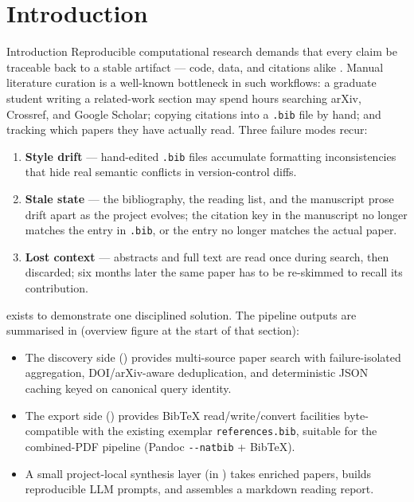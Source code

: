 \documentclass[
  ignorenonframetext,
]{beamer}
\author{\texorpdfstring{}{}}
\date{}
\providecommand{\tightlist}{%
  \setlength{\itemsep}{0pt}\setlength{\parskip}{0pt}}
\begin{document}
\section{Introduction}\label{sec:introduction}

\begin{frame}{Introduction}
Reproducible computational research demands that every claim be
traceable back to a stable artifact --- code, data, and citations alike
. Manual literature curation is a well-known
bottleneck in such workflows: a graduate student writing a related-work
section may spend hours searching arXiv, Crossref, and Google Scholar;
copying citations into a \texttt{.bib} file by hand; and tracking which
papers they have actually read. Three failure modes recur:

\begin{enumerate}
\tightlist
\item
  \textbf{Style drift} --- hand-edited \texttt{.bib} files accumulate
  formatting inconsistencies that hide real semantic conflicts in
  version-control diffs.
\item
  \textbf{Stale state} --- the bibliography, the reading list, and the
  manuscript prose drift apart as the project evolves; the citation key
  in the manuscript no longer matches the entry in \texttt{.bib}, or the
  entry no longer matches the actual paper.
\item
  \textbf{Lost context} --- abstracts and full text are read once during
  search, then discarded; six months later the same paper has to be
  re-skimmed to recall its contribution.
\end{enumerate}

 exists to demonstrate one disciplined
solution. The pipeline outputs are summarised in 
(overview figure at the start of that section):

\begin{itemize}
\tightlist
\item
  The discovery side
  (\href{../../../../infrastructure/search/}{})
  provides multi-source paper search with failure-isolated aggregation,
  DOI/arXiv-aware deduplication, and deterministic JSON caching keyed on
  canonical query identity.
\item
  The export side
  (\href{../../../../infrastructure/reference/}{})
  provides BibTeX read/write/convert facilities byte-compatible with the
  existing exemplar \texttt{references.bib}, suitable for the
  combined-PDF pipeline (Pandoc \texttt{-\/-natbib} + BibTeX).
\item
  A small project-local synthesis layer (in
  \href{../src/synthesis.py}{}) takes enriched
  papers, builds reproducible LLM prompts, and assembles a markdown
  reading report.
\end{itemize}


\end{frame}
\end{document}
